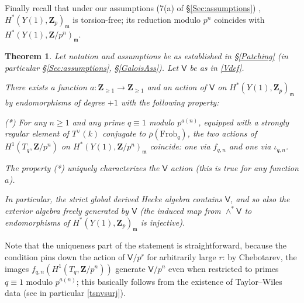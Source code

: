 \documentclass[10pt]{amsart}
\newcommand{\changecolor}{black}
\newcommand{\Z}{\mathbf{Z}}
\newcommand{\rhobar}{\overline{\rho}}
\newcommand{\Vinf}{\mathsf{V}}
\newtheorem{theorem}[subsection]{Theorem}
\theoremstyle{remark}
\begin{document}
 
Finally recall that under our assumptions (7(a) of \S \ref{Sec:assumptions}) , $H^*(Y(1), \Z_p)_{\mathfrak{m}}$ is torsion-free;
its reduction modulo $p^n$ coincides with  $H^*(Y(1), \Z/p^n)_{\mathfrak{m}}$.
\begin{theorem} \label{maintheorem}
Let notation and assumptions be as established in \S \ref{Patching}
(in particular \S \ref{Sec:assumptions},  \S \ref{GaloisAss}). 
Let $\Vinf$ be as in \eqref{Vdef}. 


 
There  exists a function $a: \mathbf{Z}_{\geq 1} \rightarrow \mathbf{Z}_{\geq 1}$ and 
an action of $\Vinf$ on $H^*(Y(1), \Z_p)_{\mathfrak{m}}$ 
by endomorphisms of degree $+1$ 
with the  following property:

(*) For any $n \geq 1$ and any  prime $q \equiv 1$ modulo $p^{a(n)}$,
equipped with a strongly regular  element  of $T^{\vee}(k)$ conjugate to 
$\rhobar(\mathrm{Frob}_q)$, 
 the two actions of $H^1(T_q, \Z/p^{n})$  on $H^*(Y(1), \Z/p^{n})_{\mathfrak{m}}$ coincide:
one via $f_{q,n}$  and one via $\iota_{q,n}$.
 
The property (*) uniquely characterizes the $\Vinf$ action (this is true for any function $a$). 
 
 In particular, the {\color{\changecolor} strict} global derived Hecke algebra
 contains $\mathsf{V}$, and so also the exterior algebra freely generated by $\mathsf{V}$
(the induced map from $\wedge^* \mathsf{V}$ 
 to endomorphisms of    $H^*(Y(1), \Z_p)_{\mathfrak{m}}$ is injective). 
 \end{theorem}




 Note that the
 uniqueness part of the statement is straightforward, because the condition pins down the action of $\mathsf{V}/p^r$ for arbitrarily large $r$:
by Chebotarev, 
  the images $f_{q,n}(H^1(T_q, \Z/p^n))$ generate $\mathsf{V}/p^n$ even when restricted to primes $q \equiv 1$ modulo $p^{a(n)}$;
  this basically  follows from the existence of Taylor--Wiles data (see in particular  \eqref{tsnvsurj}). 
\end{document}
